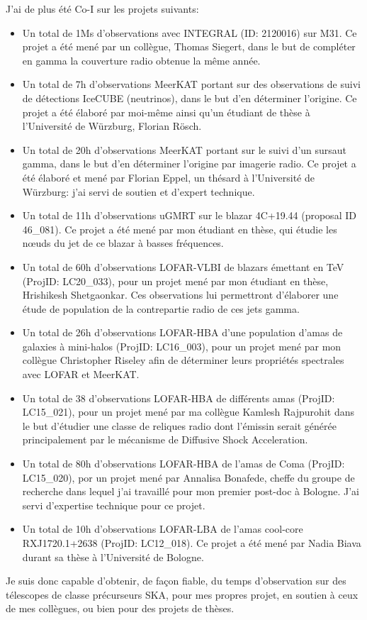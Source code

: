 \pg
J'ai de plus \'et\'e Co-I sur les projets suivants:
\begin{itemize}
	\item Un total de 1Ms d'observations avec INTEGRAL (ID: 2120016) sur M31. Ce projet a \'et\'e men\'e par un coll\`egue, Thomas Siegert, dans le but de compl\'eter en gamma la couverture radio obtenue la m\^eme ann\'ee.
	\item Un total de 7h d'observations MeerKAT portant sur des observations de suivi de d\'etections IceCUBE (neutrinos), dans le but d'en d\'eterminer l'origine. Ce projet a \'et\'e \'elabor\'e par moi-m\^eme ainsi qu'un \'etudiant de th\`ese \`a l'Universit\'e de W\"urzburg, Florian R\"osch.
	\item Un total de 20h d'observations MeerKAT portant sur le suivi d'un sursaut gamma, dans le but d'en d\'eterminer l'origine par imagerie radio. Ce projet a \'et\'e \'elabor\'e et men\'e par Florian Eppel, un th\'esard \`a l'Universit\'e de W\"urzburg: j'ai servi de soutien et d'expert technique.
	\item Un total de 11h d'observations uGMRT sur le blazar 4C+19.44 (proposal ID 46\_081). Ce projet a \'et\'e men\'e par mon \'etudiant en th\`ese, qui \'etudie les n{\oe}uds du jet de ce blazar \`a basses fr\'equences.
	\item Un total de 60h d'observations LOFAR-VLBI de blazars \'emettant en TeV (ProjID: LC20\_033), pour un projet men\'e par mon \'etudiant en th\`ese, Hrishikesh Shetgaonkar. Ces observations lui permettront d'\'elaborer une \'etude de population de la contrepartie radio de ces jets gamma.
	\item Un total de 26h d'observations LOFAR-HBA d'une population d'amas de galaxies \`a mini-halos (ProjID: LC16\_003), pour un projet men\'e par mon coll\`egue Christopher Riseley afin de d\'eterminer leurs propri\'et\'es spectrales avec LOFAR et MeerKAT. 
	\item Un total de 38 d'observations LOFAR-HBA de diff\'erents amas (ProjID: LC15\_021), pour un projet men\'e par ma coll\`egue Kamlesh Rajpurohit dans le but d'\'etudier une classe de reliques radio dont l'\'emissin serait g\'en\'er\'ee principalement par le m\'ecanisme de Diffusive Shock Acceleration.
	\item Un total de 80h d'observations LOFAR-HBA de l'amas de Coma (ProjID: LC15\_020), por un projet men\'e par Annalisa Bonafede, cheffe du groupe de recherche dans lequel j'ai travaill\'e pour mon premier post-doc \`a Bologne. J'ai servi d'expertise technique pour ce projet.
	\item Un total de 10h d'observations LOFAR-LBA de l'amas cool-core RXJ1720.1+2638 (ProjID: LC12\_018). Ce projet a \'et\'e men\'e par Nadia Biava durant sa th\`ese \`a l'Universit\'e de Bologne.
\end{itemize}

\pg
Je suis donc capable d'obtenir, de fa\c{c}on fiable, du temps d'observation sur des t\'elescopes de classe pr\'ecurseurs SKA, pour mes propres projet, en soutien \`a ceux de mes coll\`egues, ou bien pour des projets de th\`eses.






